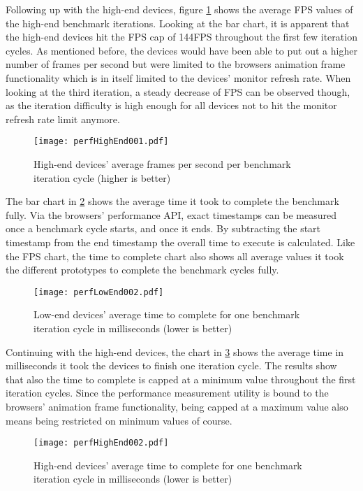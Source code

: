 Following up with the high-end devices, figure \ref{fig:perfHighEnd001} shows the average FPS values of the high-end benchmark iterations. Looking at the bar chart, it is apparent that the high-end devices hit the FPS cap of 144FPS throughout the first few iteration cycles. As mentioned before, the devices would have been able to put out a higher number of frames per second but were limited to the browsers animation frame functionality which is in itself limited to the devices' monitor refresh rate. When looking at the third iteration, a steady decrease of FPS can be observed though, as the iteration difficulty is high enough for all devices not to hit the monitor refresh rate limit anymore.

\begin{figure}
\centering
\texttt{[image: perfHighEnd001.pdf]}
\caption{High-end devices' average frames per second per benchmark iteration cycle (higher is better)}
\label{fig:perfHighEnd001}
\end{figure}

The bar chart in \ref{fig:perfLowEnd002} shows the average time it took to complete the benchmark fully. Via the browsers' performance API, exact timestamps can be measured once a benchmark cycle starts, and once it ends. By subtracting the start timestamp from the end timestamp the overall time to execute is calculated. Like the FPS chart, the time to complete chart also shows all average values it took the different prototypes to complete the benchmark cycles fully.

\begin{figure}
\centering
\texttt{[image: perfLowEnd002.pdf]}
\caption{Low-end devices' average time to complete for one benchmark iteration cycle in milliseconds (lower is better)}
\label{fig:perfLowEnd002}
\end{figure}

Continuing with the high-end devices, the chart in \ref{fig:perfHighEnd002} shows the average time in milliseconds it took the devices to finish one iteration cycle. The results show that also the time to complete is capped at a minimum value throughout the first iteration cycles. Since the performance measurement utility is bound to the browsers' animation frame functionality, being capped at a maximum value also means being restricted on minimum values of course.

\begin{figure}
\centering
\texttt{[image: perfHighEnd002.pdf]}
\caption{High-end devices' average time to complete for one benchmark iteration cycle in milliseconds (lower is better)}
\label{fig:perfHighEnd002}
\end{figure}

